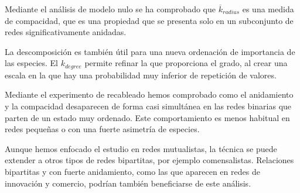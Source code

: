 Mediante el análisis de modelo nulo se ha comprobado que $\overline {k}_{radius}$ es una medida de compacidad, que es una propiedad que se presenta solo en un subconjunto de redes significativamente anidadas.

La descomposición es también útil para una nueva ordenación de importancia de las especies. El ${k}_{degree}$ permite refinar la que proporciona el grado, al crear una escala en la que hay una probabilidad muy inferior de repetición de valores.

Mediante el experimento de recableado hemos comprobado como el anidamiento y la compacidad desaparecen de forma casi simultánea en las redes binarias que parten de un estado muy ordenado. Este comportamiento es menos habitual en redes pequeñas o con una fuerte asimetría de especies.

Aunque hemos enfocado el estudio en redes mutualistas, la técnica se puede extender a otros tipos de redes bipartitas, por ejemplo comensalistas. Relaciones bipartitas y con fuerte anidamiento, como las que aparecen en redes de innovación y comercio, podrían también beneficiarse de este análisis.

